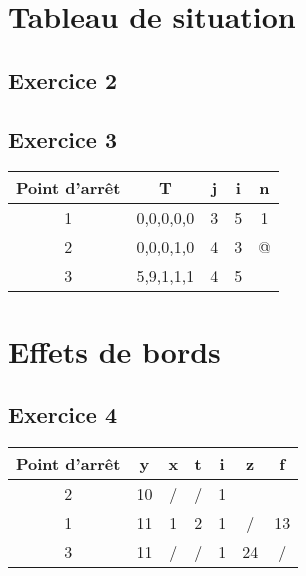	\section{Tableau de situation}	
	\subsection{Exercice 2}
\subsection{Exercice 3}


\begin{center}
\begin{tabular}{c  |  c  c  c  c  }
	\textbf{Point d'arrêt }& \textbf{T} & \textbf{j} & \textbf{i} &\textbf{n}\\
	\hline
	1 & 0,0,0,0,0 & 3 & 5 & 1\\
	\hline
	2 & 0,0,0,1,0 & 4 & 3 & @\\
	\hline
	3 & 5,9,1,1,1&4&5&\\
	\hline
\end{tabular}
\end{center}
\newpage
\section{Effets de bords}
\subsection{Exercice 4}

\begin{center}
\begin{tabular}{c |  c  c  c  c  c  c  }
	\textbf{Point d'arrêt} & \textbf{y} & \textbf{x} & \textbf{t} & \textbf{i} & \textbf{z} & \textbf{f}\\
	\hline
	2 & 10 & / & / & 1 && \\
	\hline
	1 & 11 & 1 & 2 & 1 & / & 13\\
	\hline
	3 & 11 & / & / & 1 & 24 & /\\
	\hline
\end{tabular}
\end{center}
\newpage
